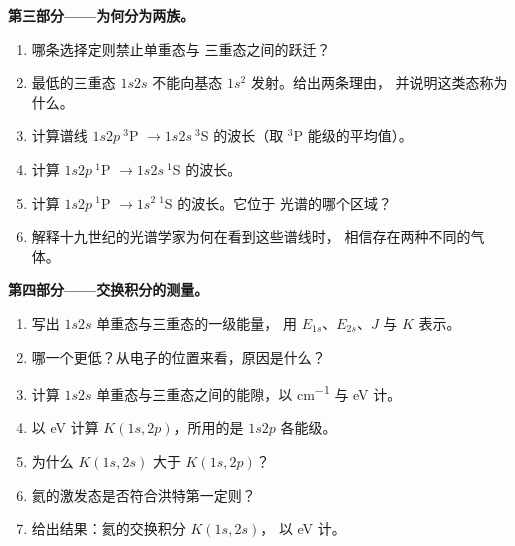 \begin{problem}
\medskip\noindent\textbf{第三部分——为何分为两族。}
\begin{enumerate}[resume]
  \item 哪条选择定则禁止单重态与
        三重态之间的跃迁？
  \item 最低的三重态 $1s2s$  不能向基态
        $1s^2$  发射。给出两条理由，
        并说明这类态称为什么。
  \item 计算谱线 $1s2p\ {}^3$P $\to 1s2s\ {}^3$S 的波长（取
        ${}^3$P 能级的平均值）。
  \item 计算 $1s2p\ {}^1$P $\to 1s2s\ {}^1$S 的波长。
  \item 计算 $1s2p\ {}^1$P $\to 1s^2\ {}^1$S 的波长。它位于
        光谱的哪个区域？
  \item 解释十九世纪的光谱学家为何在看到这些谱线时，
        相信存在两种不同的气体。
\end{enumerate}

\medskip\noindent\textbf{第四部分——交换积分的测量。}
\begin{enumerate}[resume]
  \item 写出 $1s2s$ 单重态与三重态的一级能量，
        用 $E_{1s}$、$E_{2s}$、$J$ 与 $K$ 表示。
  \item 哪一个更低？从电子的位置来看，原因是什么？
  \item 计算 $1s2s$ 单重态与三重态之间的能隙，以 \unit{cm^{-1}} 与 eV 计。
  \item 以 eV 计算 $K(1s,2p)$，所用的是 $1s2p$ 各能级。
  \item 为什么 $K(1s,2s)$ 大于 $K(1s,2p)$？
  \item 氦的激发态是否符合洪特第一定则？
  \item 给出结果：氦的交换积分 $K(1s,2s)$，
        以 eV 计。
\end{enumerate}
\end{problem}
